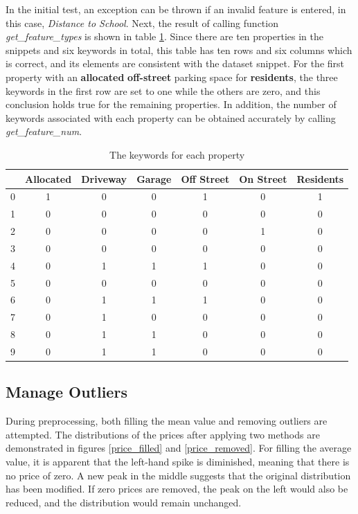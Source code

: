 \documentclass[12pt,twoside]{report}
\begin{document}
In the initial test, an exception can be thrown if an invalid feature is entered, in this case, \textit{Distance to School}. Next, the result of calling function \textit{get\_feature\_types} is shown in table \ref{parking_types}. Since there are ten properties in the snippets and six keywords in total, this table has ten rows and six columns which is correct, and its elements are consistent with the dataset snippet. For the first property with an \textbf{allocated} \textbf{off-street} parking space for \textbf{residents}, the three keywords in the first row are set to one while the others are zero, and this conclusion holds true for the remaining properties. In addition, the number of keywords associated with each property can be obtained accurately by calling \textit{get\_feature\_num}. 

\begin{table}[!htbp]
	\centering
	\caption{The keywords for each property}
	\label{parking_types}
	\begin{tabular}{| c | c | c | c | c | c | c |}
		\hline
		& Allocated & Driveway & Garage & Off Street & On Street & Residents\\
		\hline
		0 & 1 & 0 & 0 & 1 & 0 & 1 \\ 
		\hline
		1 & 0 & 0 & 0 & 0 & 0 & 0 \\
		\hline
		2 & 0 & 0 & 0 & 0 & 1 & 0 \\
		\hline
		3 & 0 & 0 & 0 & 0 & 0 & 0 \\
		\hline
		4 & 0 & 1 & 1 & 1 & 0 & 0 \\
		\hline
		5 & 0 & 0 & 0 & 0 & 0 & 0 \\
		\hline
		6 & 0 & 1 & 1 & 1 & 0 & 0 \\
		\hline
		7 & 0 & 1 & 0 & 0 & 0 & 0 \\
		\hline
		8 & 0 & 1 & 1 & 0 & 0 & 0 \\
		\hline
		9 & 0 & 1 & 1 & 0 & 0 & 0 \\
		\hline
	\end{tabular}
\end{table}

\subsection{Manage Outliers}
During preprocessing, both filling the mean value and removing outliers are attempted. The distributions of the prices after applying two methods are demonstrated in figures \ref{price_filled} and \ref{price_removed}. For filling the average value, it is apparent that the left-hand spike is diminished, meaning that there is no price of zero. A new peak in the middle suggests that the original distribution has been modified. If zero prices are removed, the peak on the left would also be reduced, and the distribution would remain unchanged. 
\\
\end{document}
